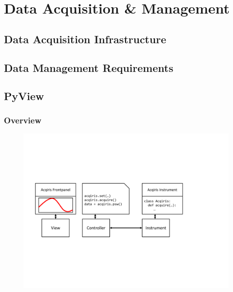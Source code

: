 \chapter{Data Acquisition \& Management}


\section{Data Acquisition Infrastructure}


\section{Data Management Requirements}


\section{PyView}


\subsection{Overview}

\begin{figure}[ht!]
	\centering
	\includegraphics[width=\textwidth]{"./material/figures/appendix/data-acquisition/pyview_schematic"}
	\caption[]{}
	\label{fig:pyview_schematic}
\end{figure}

